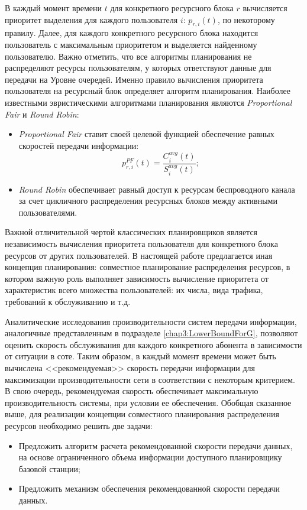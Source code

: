В каждый момент времени $t$ для конкретного ресурсного блока $r$ вычисляется приоритет выделения для каждого пользователя $i$: $p_{r,i}(t)$, по некоторому правилу. Далее, для каждого конкретного ресурсного блока находится пользователь с максимальным приоритетом и выделяется найденному пользователю. Важно отметить, что все алгоритмы планирования не распределяют ресурсы пользователям, у которых ответствуют данные для передачи на Уровне очередей. Именно правило вычисления приоритета пользователя на ресурсный блок определяет алгоритм планирования. Наиболее известными эвристическими алгоритмами планирования являются \textit{Proportional Fair} и \textit{Round Robin}:
\begin{itemize}
	\item \textit{Proportional Fair} ставит своей целевой функцией обеспечение равных скоростей передачи информации:
	$$p^{PF}_{r,i}(t) = \frac{C_i^{avg}(t)}{S_i^{avg}(t)};$$
	\item \textit{Round Robin} обеспечивает равный доступ к ресурсам беспроводного канала за счет цикличного распределения ресурсных блоков между активными пользователями.
\end{itemize}

Важной отличительной чертой классических планировщиков является независимость вычисления приоритета пользователя для конкретного блока ресурсов от других пользователей. В настоящей работе предлагается иная концепция планирования: совместное планирование распределения ресурсов, в котором важную роль выполняет зависимость вычисление приоритета от характеристик всего множества пользователей: их числа, вида трафика, требований к обслуживанию и т.д.

Аналитические исследования производительности систем передачи информации, аналогичные представленным в подразделе \ref{chap3:LowerBoundForG}, позволяют оценить скорость обслуживания для каждого конкретного абонента в зависимости от ситуации в соте. Таким образом, в каждый момент времени может быть вычислена <<рекомендуемая>> скорость передачи информации для максимизации производительности сети в соответствии с некоторым критерием. В свою очередь, рекомендуемая скорость обеспечивает максимальную производительность системы, при условии ее обеспечения. Обобщая сказанное выше, для реализации концепции совместного планирования распределения ресурсов необходимо решить две задачи:
\begin{itemize}
	\item Предложить алгоритм расчета рекомендованной скорости передачи данных, на основе ограниченного объема информации доступного планировщику базовой станции;
	\item Предложить механизм обеспечения рекомендованной скорости передачи данных.
\end{itemize}

